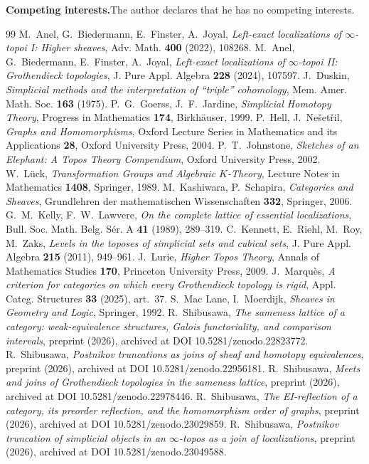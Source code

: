 \documentclass[11pt]{amsart}
\theoremstyle{definition}
\begin{document}
\noindent\textbf{Competing interests.}\quad The author declares that he has no
competing interests.

\begin{thebibliography}{99}
 M.~Anel, G.~Biedermann, E.~Finster, A.~Joyal, \emph{Left-exact
localizations of $\infty$-topoi I: Higher sheaves}, Adv. Math. \textbf{400}
(2022), 108268.
 M.~Anel, G.~Biedermann, E.~Finster, A.~Joyal, \emph{Left-exact
localizations of $\infty$-topoi II: Grothendieck topologies}, J. Pure Appl.
Algebra \textbf{228} (2024), 107597.
 J.~Duskin, \emph{Simplicial methods and the interpretation
of ``triple'' cohomology}, Mem. Amer. Math. Soc. \textbf{163} (1975).
 P.~G.~Goerss, J.~F.~Jardine, \emph{Simplicial Homotopy Theory},
Progress in Mathematics \textbf{174}, Birkh\"auser, 1999.
 P.~Hell, J.~Ne\v{s}et\v{r}il, \emph{Graphs and Homomorphisms},
Oxford Lecture Series in Mathematics and its Applications \textbf{28}, Oxford
University Press, 2004.
 P.~T.~Johnstone, \emph{Sketches of an Elephant: A Topos
Theory Compendium}, Oxford University Press, 2002.
 W.~L\"uck, \emph{Transformation Groups and Algebraic $K$-Theory},
Lecture Notes in Mathematics \textbf{1408}, Springer, 1989.
 M.~Kashiwara, P.~Schapira, \emph{Categories and Sheaves},
Grundlehren der mathematischen Wissenschaften \textbf{332}, Springer, 2006.
 G.~M.~Kelly, F.~W.~Lawvere, \emph{On the complete lattice of
essential localizations}, Bull. Soc. Math. Belg. S\'er. A \textbf{41} (1989),
289--319.
 C.~Kennett, E.~Riehl, M.~Roy, M.~Zaks, \emph{Levels in the
toposes of simplicial sets and cubical sets}, J. Pure Appl. Algebra
\textbf{215} (2011), 949--961.
 J.~Lurie, \emph{Higher Topos Theory}, Annals of Mathematics
Studies \textbf{170}, Princeton University Press, 2009.
 J.~Marqu\`es, \emph{A criterion for categories on which
every Grothendieck topology is rigid}, Appl. Categ. Structures \textbf{33}
(2025), art.\ 37.
 S.~Mac Lane, I.~Moerdijk, \emph{Sheaves in Geometry and Logic},
Springer, 1992.
 R.~Shibusawa, \emph{The sameness lattice of a category:
weak-equivalence structures, Galois functoriality, and comparison intervals},
preprint (2026), archived at DOI 10.5281/zenodo.22823772.
 R.~Shibusawa, \emph{Postnikov truncations as joins of sheaf
and homotopy equivalences}, preprint (2026), archived at DOI 10.5281/zenodo.22956181.
 R.~Shibusawa, \emph{Meets and joins of Grothendieck
topologies in the sameness lattice}, preprint (2026), archived at DOI
10.5281/zenodo.22978446.
 R.~Shibusawa, \emph{The EI-reflection of a category, its preorder
reflection, and the homomorphism order of graphs}, preprint (2026), archived at
DOI 10.5281/zenodo.23029859.
 R.~Shibusawa, \emph{Postnikov truncation of simplicial objects
in an $\infty$-topos as a join of localizations}, preprint (2026), archived at
DOI 10.5281/zenodo.23049588.
\end{thebibliography}
\end{document}
